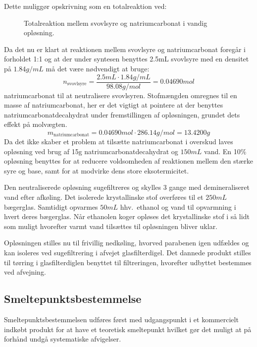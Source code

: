     Dette muliggør opskrivning som en totalreaktion ved:
    \begin{figure}[H]
        \caption{Totalreaktion mellem svovlsyre og natriumcarbonat i vandig opløsning.}
    \end{figure}
    Da det nu er klart at reaktionen mellem svovlsyre og natriumcarbonat foregår i forholdet 1:1 og at der under syntesen benyttes 2.5mL svovlsyre med en densitet på $1.84\si{g \per mL}$ må det være nødvendigt at bruge:
    \[
        n_{\text{svovlsyre}}=\frac{2.5\si{mL} \cdot 1.84\si{g\per mL}}{98.08\si{g\per mol}}=0.04690mol
    \]
    natriumcarbonat til at neutralisere svovlsyren. Stofmængden omregnes til en masse af natriumcarbonat, her er det vigtigt at pointere at der benyttes natriumcarbonatdecahydrat under fremstillingen af opløsningen, grundet dets effekt på molvægten.
    \[
        m_{\text{natriumcarbonat}}=0.04690\si{mol} \cdot 286.14\si{g\per mol}=13.4200\si{g}
    \]
    Da det ikke skaber et problem at tilsætte natriumcarbonat i overskud laves opløsning ved brug af 15g natriumcarbonatdecahydrat og $150\si{mL}$ vand. En 10\% opløsning benyttes for at reducere voldsomheden af reaktionen mellem den stærke syre og base, samt for at modvirke dens store eksotermicitet.

    Den neutraliserede opløsning sugefiltreres og skylles 3 gange med demineraliseret vand efter afkøling. Det isolerede krystallinske stof overføres til et $250\si{mL}$ bægerglas. Samtidigt opvarmes $50\si{mL}$ hhv.\ ethanol og vand til opvarmning i hvert deres bægerglas. Når ethanolen koger opløses det krystallinske stof i så lidt som muligt hvorefter varmt vand tilsættes til opløsningen bliver uklar.

    Opløsningen stilles nu til frivillig nedkøling, hvorved parabenen igen udfældes og kan isoleres ved sugefiltrering i afvejet glasfilterdigel. Det dannede produkt stilles til tørring i glasfilterdiglen benyttet til filtreringen, hvorefter udbyttet bestemmes ved afvejning.

    \subsection{Smeltepunktsbestemmelse}
    Smeltepunktsbestemmelsen udføres først med udgangspunkt i et kommercielt indkøbt produkt for at have et teoretisk smeltepunkt hvilket gør det muligt at på forhånd undgå systematiske afvigelser. 


